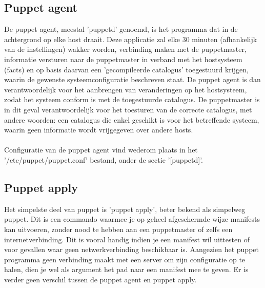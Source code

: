 \subsection{Puppet agent}
De puppet agent, meestal 'puppetd' genoemd, is het programma dat in de achtergrond op elke host draait. Deze applicatie zal elke 30 minuten (afhankelijk van de instellingen) wakker worden, verbinding maken met de puppetmaster, informatie versturen naar de puppetmaster in verband met het hostsysteem (facts) en op basis daarvan een 'gecompileerde catalogus' toegestuurd krijgen, waarin de gewenste systeemconfiguratie beschreven staat. De puppet agent is dan verantwoordelijk voor het aanbrengen van veranderingen op het hostsysteem, zodat het systeem conform is met de toegestuurde catalogus. De puppetmaster is in dit geval verantwoordelijk voor het toesturen van de correcte catalogus, met andere woorden: een catalogus die enkel geschikt is voor het betreffende systeem, waarin geen informatie wordt vrijgegeven over andere hosts.\\\\
Configuratie van de puppet agent vind wederom plaats in het '/etc/puppet/puppet.conf' bestand, onder de sectie '[puppetd]'.

\subsection{Puppet apply}
Het simpelste deel van puppet is 'puppet apply', beter bekend als simpelweg puppet. Dit is een commando waarmee je op geheel afgeschermde wijze manifests kan uitvoeren, zonder nood te hebben aan een puppetmaster of zelfs een internetverbinding. Dit is vooral handig indien je een manifest wil uittesten of voor gevallen waar geen netwerkverbinding beschikbaar is. Aangezien het puppet programma geen verbinding maakt met een server om zijn configuratie op te halen, dien je wel als argument het pad naar een manifest mee te geven. Er is verder geen verschil tussen de puppet agent en puppet apply.

